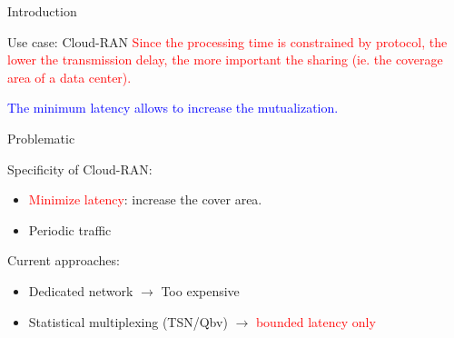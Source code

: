 \documentclass[10 pt]{beamer}
\begin{document}
\begin{section}{Introduction}
\begin{frame}{Use case: Cloud-RAN}
  \textcolor{red}{Since the processing time is constrained by protocol, the lower the transmission delay, the more important the sharing (ie. the coverage area of a data center).}
  
  \textcolor{blue}{The minimum latency allows to increase the mutualization.}
  
  
\end{frame}


\begin{frame}{Problematic}
  \centering
  
  
 \begin{multicols}{2}
Specificity of Cloud-RAN:
\vspace{1cm}
\begin{itemize}
\item \textcolor{red}{Minimize latency}: increase the cover area.
\item Periodic traffic 

\end{itemize}
\vspace{2cm}
Current approaches: \begin{itemize}
\vspace{1cm}
\item Dedicated network $\rightarrow$ Too expensive
\item Statistical multiplexing (TSN/Qbv) $\rightarrow$ \textcolor{red}{bounded latency only}
\end{itemize}
\end{multicols}

\end{frame}

\end{section}
\end{document}
